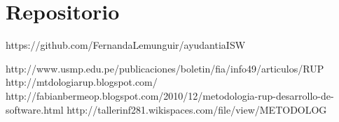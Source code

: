 \documentclass{article}
\begin{document}

\section{Repositorio}

https://github.com/FernandaLemunguir/ayudantiaISW

\begin{thebibliography}{99}

\bibitem http://www.usmp.edu.pe/publicaciones/boletin/fia/info49/articulos/RUP%
\bibitem http://mtdologiarup.blogspot.com/
\bibitem http://fabianbermeop.blogspot.com/2010/12/metodologia-rup-desarrollo-de-software.html
\bibitem http://tallerinf281.wikispaces.com/file/view/METODOLOG%

\end{thebibliography}
\end{document}
